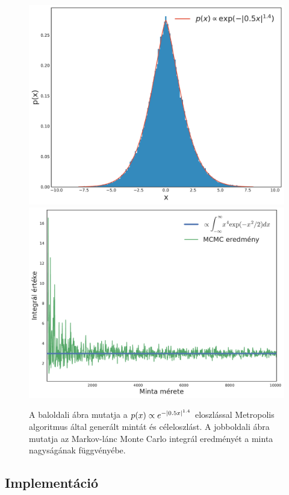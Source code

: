 \documentclass[11pt,a4paper]{article}
\numberwithin{equation}{subsection}
\numberwithin{figure}{section}
\begin{document}
\begin{figure}[H]
\centering
\includegraphics[scale=0.35]{pic/Coulomb/MCSamples.pdf}
\includegraphics[scale=0.33]{pic/Coulomb/MCMCInt.pdf}
\caption{A baloldali ábra mutatja a $p(x)\propto e^{-\abs{0.5x}^{1.4}}$ eloszlással Metropolis algoritmus által generált mintát és céleloszlást. A jobboldali ábra mutatja az Markov-lánc Monte Carlo integrál eredményét a minta nagyságának függvényébe. }
\label{fig:MCMC}
\end{figure}

\subsection{Implementáció}
\end{document}
